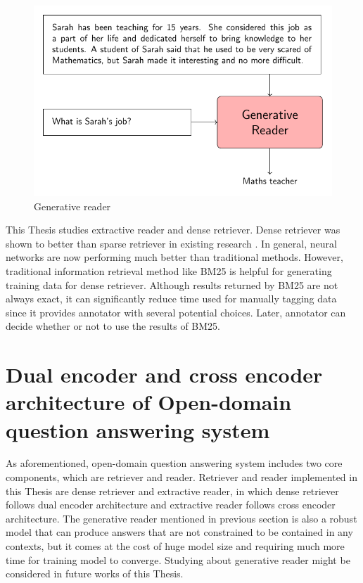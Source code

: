 \documentclass[12pt, sort&compress]{report}
\begin{document}
\begin{figure}
	\centering
	\includegraphics[scale=1.0]{images/PDF/generative_reader/generative_reader.pdf}
	\caption{Generative reader}
	\label{fig:03}
\end{figure}
This Thesis studies extractive reader and dense retriever. Dense retriever was shown to better than sparse retriever in existing research \cite{karpukhin2020dense}. In general, neural networks are now performing much better than traditional methods. However, traditional information retrieval method like BM25 is helpful for generating training data for dense retriever. %
Although results returned by BM25 are not always exact, it can significantly reduce time used for manually tagging data since it provides annotator with several potential choices. Later, annotator can decide whether or not to use the results of BM25.
\section{Dual encoder and cross encoder architecture of Open-domain question answering system}
\label{sec:3.2}
As aforementioned, open-domain question answering system includes two core components, which are retriever and reader. Retriever and reader implemented in this Thesis are dense retriever and extractive reader, in which dense retriever follows dual encoder architecture and extractive reader follows cross encoder architecture. The generative reader mentioned in previous section is also a robust model that can produce answers that are not constrained to be contained in any contexts, but it comes at the cost of huge model size and requiring much more time for training model to converge. Studying about generative reader might be considered in future works of this Thesis.
\end{document}
